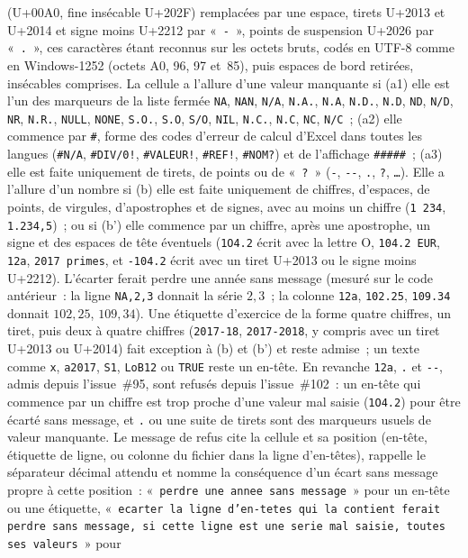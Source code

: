 \documentclass[a4paper,11pt]{article}
\newcommand{\code}[1]{\texttt{\small #1}}
\begin{document}
(U+00A0, fine insécable U+202F) remplacées par une espace, tirets U+2013 et U+2014 et signe
moins U+2212 par «~\code{-}~», points de suspension U+2026 par «~\code{.}~», ces caractères
étant reconnus sur les octets bruts, codés en UTF-8 comme en Windows-1252 (octets A0, 96, 97
et~85), puis espaces de bord retirées, insécables comprises. La cellule a l'allure d'une valeur
manquante si (a1) elle est l'un des marqueurs de la liste fermée \code{NA}, \code{NAN},
\code{N/A}, \code{N.A.}, \code{N.A}, \code{N.D.}, \code{N.D}, \code{ND}, \code{N/D}, \code{NR},
\code{N.R.}, \code{NULL}, \code{NONE}, \code{S.O.}, \code{S.O}, \code{S/O}, \code{NIL},
\code{N.C.}, \code{N.C}, \code{NC}, \code{N/C}~; (a2) elle commence par \code{\#}, forme des
codes d'erreur de calcul d'Excel dans toutes les langues (\code{\#N/A}, \code{\#DIV/0!},
\code{\#VALEUR!}, \code{\#REF!}, \code{\#NOM?}) et de l'affichage \code{\#\#\#\#\#}~; (a3)
elle est faite uniquement de tirets, de points ou de «~\code{?}~» (\code{-}, \code{-{}-}, \code{.}, \code{?}, \code{\ldots}). Elle a
l'allure d'un nombre si (b) elle est faite uniquement de chiffres, d'espaces, de points, de
virgules, d'apostrophes et de signes, avec au moins un chiffre (\code{1 234}, \code{1.234,5})~;
ou si (b') elle commence par un chiffre, après une apostrophe, un signe et des espaces de tête
éventuels (\code{1O4.2} écrit avec la lettre O, \code{104.2 EUR}, \code{12a}, \code{2017 primes},
et \code{-104.2} écrit avec un tiret U+2013 ou le signe moins U+2212). L'écarter ferait perdre
une année sans message (mesuré sur le code antérieur~: la ligne \code{NA,2,3} donnait la série
$2, 3$~; la colonne \code{12a}, \code{102.25}, \code{109.34} donnait $102{,}25$, $109{,}34$). Une
étiquette d'exercice de la forme quatre chiffres, un tiret, puis deux à quatre chiffres
(\code{2017-18}, \code{2017-2018}, y compris avec un tiret U+2013 ou U+2014) fait exception à (b)
et (b') et reste admise~; un texte comme \code{x}, \code{a2017}, \code{S1}, \code{LoB12} ou
\code{TRUE} reste un en-tête. En revanche \code{12a}, \code{.} et \code{-{}-}, admis depuis
l'issue~\#95, sont refusés depuis l'issue~\#102~: un en-tête qui commence par un chiffre est
trop proche d'une valeur mal saisie (\code{1O4.2}) pour être écarté sans message, et
\code{.} ou une suite de tirets sont des marqueurs usuels de valeur manquante. Le message de refus cite la cellule et sa position (en-tête, étiquette de ligne, ou colonne du
fichier dans la ligne d'en-têtes), rappelle le séparateur décimal attendu et nomme la
conséquence d'un écart sans message propre à cette position~: «~\code{perdre une annee sans
message}~» pour un en-tête ou une étiquette, «~\code{ecarter la ligne d'en-tetes qui la contient
ferait perdre sans message, si cette ligne est une serie mal saisie, toutes ses valeurs}~» pour
\end{document}
